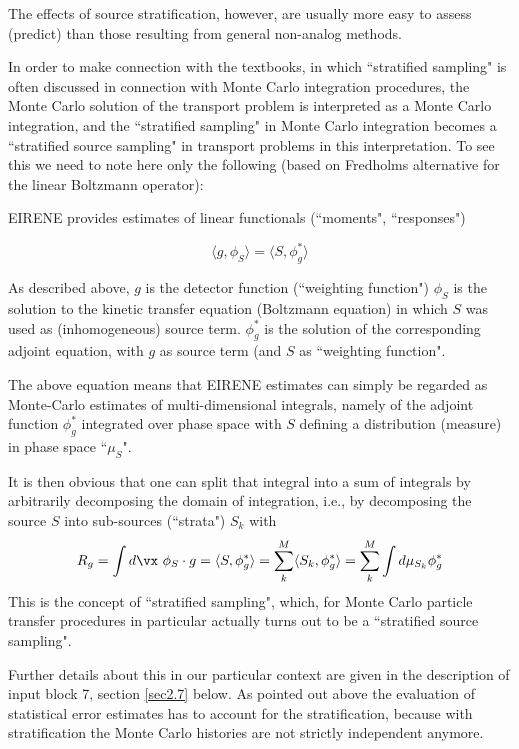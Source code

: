The effects of source stratification, however, are usually more easy to
assess (predict) than those resulting from general non-analog methods.

In order to make connection with the textbooks, in which ``stratified sampling" is often discussed
in connection with Monte Carlo integration procedures,
the Monte Carlo solution of the transport problem is interpreted as a Monte Carlo integration,
and the ``stratified sampling" in Monte Carlo integration becomes a ``stratified source sampling" in
transport problems in this interpretation. To see this we need to note
here only the following (based on Fredholms alternative for the linear Boltzmann operator):

EIRENE provides estimates of linear functionals (``moments",
``responses")

\begin{equation}  \label{fredhalt}
\langle g,\phi_S\rangle    = \langle S,\phi^*_g\rangle
\end{equation}

As described above, $g$ is the detector function (``weighting
function") $\phi_S $ is the solution to the kinetic transfer
equation (Boltzmann equation) in which $S$ was used as (inhomogeneous)
source term. $\phi^*_g$ is the solution of the corresponding
adjoint equation, with $g$ as source term (and $S$ as ``weighting function".

The above equation means that EIRENE estimates can simply be
regarded as Monte-Carlo estimates of multi-dimensional integrals,
namely of the adjoint function $\phi^*_g$ integrated over phase
space with $S$ defining a distribution (measure) in phase space ``$\mu_S$".

It is then obvious that one can split that integral into a sum of
integrals by arbitrarily decomposing the domain of integration,
i.e., by decomposing the source $S$ into sub-sources (``strata")
$S_k$ with
\begin{equation}
R_g = \int d\vx~ \phi_S \cdot g    = \langle S,\phi^*_g\rangle  =\sum_k^{M} \langle S_k,\phi^*_g\rangle = \sum_k^{M} \int d\mu_{S_k} \phi^*_g
\end{equation}
This is the concept of ``stratified sampling", which, for Monte Carlo
particle transfer procedures in particular actually turns out to
be a ``stratified source sampling".

Further details about this in our particular context are given in
the description of input block 7, section \ref{sec2.7} below. As pointed out above
the evaluation of statistical error estimates has to account for the stratification,
because with stratification  the Monte Carlo histories are not strictly independent anymore.

